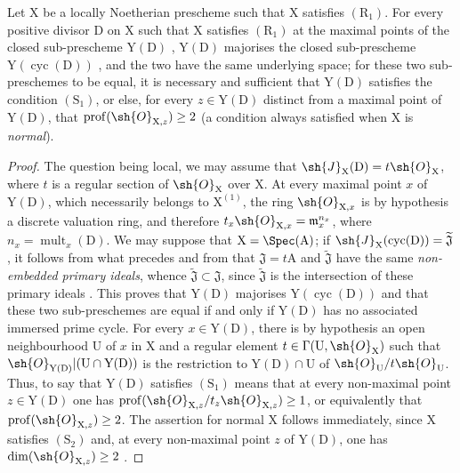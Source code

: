 \begin{corollary}[21.7.3]
\label{IV.21.7.3}
Let $\mathrm{X}$ be a locally Noetherian prescheme such that $\mathrm{X}$ satisfies $(\mathrm{R}_1)$.
For every positive divisor $\mathrm{D}$ on $\mathrm{X}$ such that $\mathrm{X}$ satisfies $(\mathrm{R}_1)$ at the maximal points of the closed sub-prescheme $\mathrm{Y}(\mathrm{D})$ , $\mathrm{Y}(\mathrm{D})$ majorises the closed sub-prescheme $\mathrm{Y}(\operatorname{cyc}(\mathrm{D}))$ , and the two have the same underlying space;
for these two sub-preschemes to be equal, it is necessary and sufficient that $\mathrm{Y}(\mathrm{D})$ satisfies the condition $(\mathrm{S}_1)$, or else, for every $z\in\mathrm{Y}(\mathrm{D})$ distinct from a maximal point of $\mathrm{Y}(\mathrm{D})$, that $\operatorname{prof}(\sh{O}_{\mathrm{X},z})\geq 2$ (a condition always satisfied when $\mathrm{X}$ is \emph{normal}).
\end{corollary}

\begin{proof}
The question being local, we may assume that $\sh{J}_\mathrm{X}(\mathrm{D})=t\sh{O}_\mathrm{X}$, where $t$ is a regular section of $\sh{O}_\mathrm{X}$ over $\mathrm{X}$.
At every maximal point $x$ of $\mathrm{Y}(\mathrm{D})$, which necessarily belongs to $\mathrm{X}^{(1)}$, the ring $\sh{O}_{\mathrm{X},x}$ is by hypothesis a discrete valuation ring, and therefore $t_x\sh{O}_{\mathrm{X},x}=\mathfrak{m}_x^{n_x}$, where $n_x=\operatorname{mult}_x(\mathrm{D})$.
We may suppose that $\mathrm{X}=\Spec(\mathrm{A})$; if $\sh{J}_\mathrm{X}(\operatorname{cyc}(\mathrm{D}))=\widetilde{\mathfrak{J}}$, it follows from what precedes and from  that $\mathfrak{J}=t\mathrm{A}$ and $\widetilde{\mathfrak{J}}$ have the same \emph{non-embedded primary ideals}, whence $\widetilde{\mathfrak{J}}\subset\mathfrak{J}$, since $\widetilde{\mathfrak{J}}$ is the intersection of
these primary ideals .
This proves that $\mathrm{Y}(\mathrm{D})$ majorises $\mathrm{Y}(\operatorname{cyc}(\mathrm{D}))$ and that these two sub-preschemes are equal if and only if $\mathrm{Y}(\mathrm{D})$ has no associated immersed prime cycle.
For every $x\in\mathrm{Y}(\mathrm{D})$, there is by hypothesis an open neighbourhood $\mathrm{U}$ of $x$ in $\mathrm{X}$ and a regular element $t\in\Gamma(\mathrm{U},\sh{O}_\mathrm{X})$ such that $\sh{O}_{\mathrm{Y}(\mathrm{D})}|(\mathrm{U}\cap\mathrm{Y}(\mathrm{D}))$ is the restriction to $\mathrm{Y}(\mathrm{D})\cap\mathrm{U}$ of $\sh{O}_\mathrm{U}/t\sh{O}_\mathrm{U}$.
Thus, to say that $\mathrm{Y}(\mathrm{D})$ satisfies $(\mathrm{S}_1)$ means that at every non-maximal point $z\in\mathrm{Y}(\mathrm{D})$ one has $\operatorname{prof}(\sh{O}_{\mathrm{X},z}/t_z\sh{O}_{\mathrm{X},z})\geq 1$, or equivalently  that $\operatorname{prof}(\sh{O}_{\mathrm{X},z})\geq 2$.
The assertion for normal $\mathrm{X}$ follows immediately, since $\mathrm{X}$ satisfies $(\mathrm{S}_2)$ and, at every non-maximal point $z$ of $\mathrm{Y}(\mathrm{D})$, one has $\dim(\sh{O}_{\mathrm{X},z})\geq 2$ .
\end{proof}

